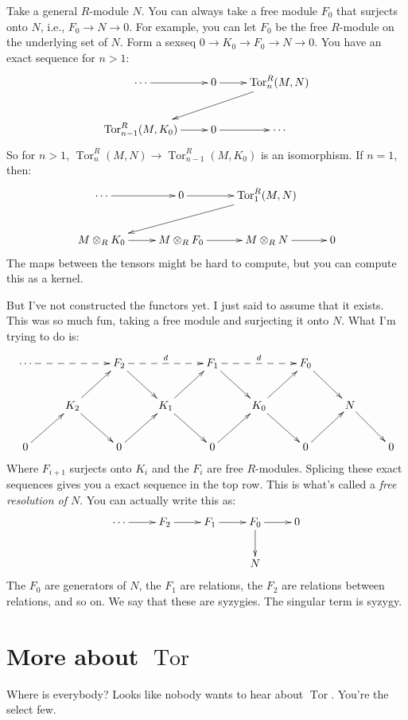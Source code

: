 \documentclass{amsart}
\theoremstyle{theorem}
\theoremstyle{definition}
\DeclareMathOperator{\Tor}{Tor}
\begin{document}
Take a general $R$-module $N$. You can always take a free module $F_0$ that surjects onto $N$, i.e., $F_0\to N\to 0$. For example, you can let $F_0$ be the free $R$-module on the underlying set of $N$. Form a sexseq $0\to K_0\to F_0\to N\to 0$. You have an exact sequence for $n>1$:
\begin{equation*}
\xymatrix{\cdots\ar[r] & 0\ar[r] & \Tor^R_n(M,N)\ar[dll]\\
\Tor^R_{n-1}(M,K_0)\ar[r] & 0\ar[r] & \cdots}
\end{equation*}
So for $n>1$, $\Tor^R_n(M,N)\to \Tor^R_{n-1}(M,K_0)$ is an isomorphism. If $n=1$, then:
\begin{equation*}
\xymatrix{\cdots\ar[r] & 0\ar[r] & \Tor^R_1(M,N)\ar[dll]\\
M\otimes_R K_0\ar[r] & M\otimes_R F_0\ar[r] & M\otimes_R N\ar[r] & 0}
\end{equation*}
The maps between the tensors might be hard to compute, but you can compute this as a kernel.

But I've not constructed the functors yet. I just said to assume that it exists. This was so much fun, taking a free module and surjecting it onto $N$. What I'm trying to do is:
\begin{equation*}
\xymatrix{\cdots\ar@{-->}[rr] & & F_2\ar[dr]\ar@{-->}[rr]^d & & F_1\ar[dr]\ar@{-->}[rr]^d & & F_0\ar[dr]\\
& K_2\ar[ur]\ar[dr] & & K_1\ar[ur]\ar[dr] & & K_0\ar[ur]\ar[dr] & & N\ar[dr]\\
0\ar[ur] & & 0\ar[ur] & & 0\ar[ur] & & 0\ar[ur] & & 0}
\end{equation*}
Where $F_{i+1}$ surjects onto $K_i$ and the $F_i$ are free $R$-modules. Splicing these exact sequences gives you a exact sequence in the top row. This is what's called a \emph{free resolution of $N$}. You can actually write this as:
\begin{equation*}
\xymatrix{\cdots\ar[r] & F_2\ar[r] & F_1\ar[r] & F_0\ar[r]\ar[d] & 0\\
 & & & N & }
\end{equation*}
The $F_0$ are generators of $N$, the $F_1$ are relations, the $F_2$ are relations between relations, and so on. We say that these are syzygies. The singular term is syzygy.
\section{More about $\Tor$}
Where is everybody? Looks like nobody wants to hear about $\Tor$. You're the select few.
\end{document}
